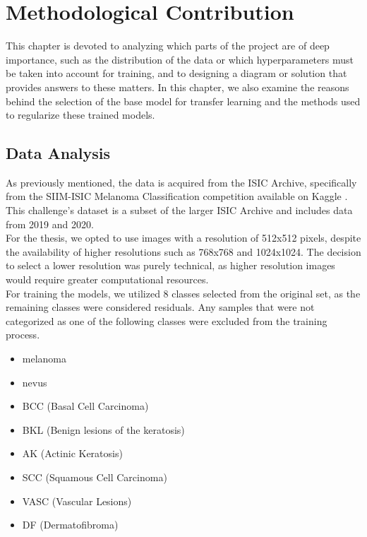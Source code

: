 \chapter{Methodological Contribution}
\label{cap:contrib}

This chapter is devoted to analyzing which parts of the project are of deep importance, such as the distribution of the data or which hyperparameters must be taken into account for training, and to designing a diagram or solution that provides answers to these matters. In this chapter, we also examine the reasons behind the selection of the base model for transfer learning and the methods used to regularize these trained models.

\section{Data Analysis}
\label{sec:data-analysis}

As previously mentioned, the data is acquired from the ISIC Archive, specifically from the SIIM-ISIC Melanoma Classification competition available on Kaggle \cite{ISICKaggle}. This challenge's dataset is a subset of the larger ISIC Archive and includes data from 2019 and 2020. \\

For the thesis, we opted to use images with a resolution of 512x512 pixels, despite the availability of higher resolutions such as 768x768 and 1024x1024. The decision to select a lower resolution was purely technical, as higher resolution images would require greater computational resources. \\

For training the models, we utilized 8 classes selected from the original set, as the remaining classes were considered residuals. Any samples that were not categorized as one of the following classes were excluded from the training process. \\

\begin{itemize}
    \item melanoma
    \item nevus
    \item BCC (Basal Cell Carcinoma)
    \item BKL (Benign lesions of the keratosis)
    \item AK (Actinic Keratosis)
    \item SCC (Squamous Cell Carcinoma)
    \item VASC (Vascular Lesions)
    \item DF (Dermatofibroma)
\end{itemize}

